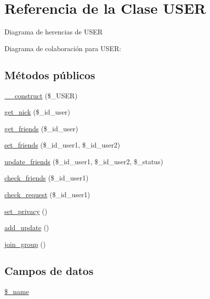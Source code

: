 \hypertarget{classUSER}{\section{Referencia de la Clase U\-S\-E\-R}
\label{classUSER}
}


Diagrama de herencias de U\-S\-E\-R


Diagrama de colaboración para U\-S\-E\-R\-:
\subsection*{Métodos públicos}
\begin{DoxyCompactItemize}
\item 
\hyperlink{classUSER_a15892f146e6b2027d102f45066962756}{\-\_\-\-\_\-construct} (\$\-\_\-\-U\-S\-E\-R)
\item 
\hyperlink{classUSER_ab27eae3cc546c0d1cca53dd8258df2ca}{get\-\_\-nick} (\$\-\_\-id\-\_\-user)
\item 
\hyperlink{classUSER_a6dc3b26d0815f3e58f04026461a24e3d}{get\-\_\-friends} (\$\-\_\-id\-\_\-user)
\item 
\hyperlink{classUSER_a51af8580bd838eadf87f1d2a34815f60}{set\-\_\-friends} (\$\-\_\-id\-\_\-user1, \$\-\_\-id\-\_\-user2)
\item 
\hyperlink{classUSER_ad71576bbcc6b8a74764136e23a64cc43}{update\-\_\-friends} (\$\-\_\-id\-\_\-user1, \$\-\_\-id\-\_\-user2, \$\-\_\-status)
\item 
\hyperlink{classUSER_a1ed467f3e4b822d4e18c12542ea7be41}{check\-\_\-friends} (\$\-\_\-id\-\_\-user1)
\item 
\hyperlink{classUSER_a90fc06b83a1b3db2837ec1c7c8b14d34}{check\-\_\-request} (\$\-\_\-id\-\_\-user1)
\item 
\hyperlink{classUSER_a91094b4a3203c555d956b8452d61ce3b}{set\-\_\-privacy} ()
\item 
\hyperlink{classUSER_a08eee4c38fa6195185760f885c3184a6}{add\-\_\-update} ()
\item 
\hyperlink{classUSER_ab2863ad83c3399cd62a792e226b64697}{join\-\_\-group} ()
\end{DoxyCompactItemize}
\subsection*{Campos de datos}
\begin{DoxyCompactItemize}
\item 
\hyperlink{classUSER_a1c89defaf5aa7ac8e526065e8572f580}{\$\-\_\-name}
\end{DoxyCompactItemize}

